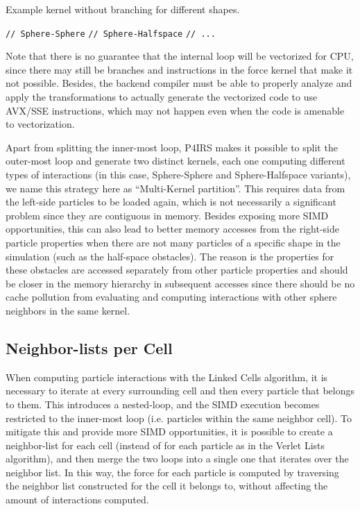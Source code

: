 \documentclass[Afour,sageh,times]{sagej}
\begin{document}
\begin{algorithm}[H]
  \caption{Example kernel without branching for different shapes.}
  \label{alg:no_branching}
  \begin{algorithmic}[1]
        \State \texttt{// Sphere-Sphere}
      \EndFor
        \State \texttt{// Sphere-Halfspace}
      \EndFor
      \State \texttt{// ...}
    \EndFor
  \end{algorithmic}
\end{algorithm}

Note that there is no guarantee that the internal loop will be vectorized for CPU, since there may still be branches and instructions in the force kernel that make it not possible.
Besides, the backend compiler must be able to properly analyze and apply the transformations to actually generate the vectorized code to use AVX/SSE instructions, which may not happen even when the code is amenable to vectorization.

Apart from splitting the inner-most loop, P4IRS makes it possible to split the outer-most loop and generate two distinct kernels, each one computing different types of interactions (in this case, Sphere-Sphere and Sphere-Halfspace variants), we name this strategy here as ``Multi-Kernel partition''.
This requires data from the left-side particles to be loaded again, which is not necessarily a significant problem since they are contiguous in memory.
Besides exposing more SIMD opportunities, this can also lead to better memory accesses from the right-side particle properties when there are not many particles of a specific shape in the simulation (such as the half-space obstacles).
The reason is the properties for these obstacles are accessed separately from other particle properties and should be closer in the memory hierarchy in subsequent accesses since there should be no cache pollution from evaluating and computing interactions with other sphere neighbors in the same kernel.

\subsection{Neighbor-lists per Cell}
\label{sec:neighbor_lists_per_cell}

When computing particle interactions with the Linked Cells algorithm, it is necessary to iterate at every surrounding cell and then every particle that belongs to them.
This introduces a nested-loop, and the SIMD execution becomes restricted to the inner-most loop (i.e. particles within the same neighbor cell).
To mitigate this and provide more SIMD opportunities, it is possible to create a neighbor-list for each cell (instead of for each particle as in the Verlet Lists algorithm), and then merge the two loops into a single one that iterates over the neighbor list.
In this way, the force for each particle is computed by traversing the neighbor list constructed for the cell it belongs to, without affecting the amount of interactions computed.
\end{document}
